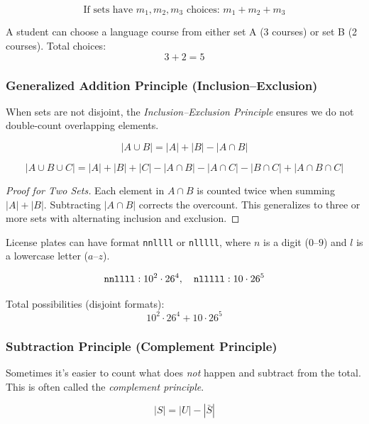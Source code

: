 \[
\text{If sets have } m_1, m_2, m_3 \text{ choices: } m_1 + m_2 + m_3
\]

\begin{eg}
A student can choose a language course from either set A (3 courses) or set B (2 courses). Total choices:
\[
3 + 2 = 5
\]
\end{eg}

\subsubsection{Generalized Addition Principle (Inclusion–Exclusion)} 
\begin{explanation}
When sets are not disjoint, the \emph{Inclusion–Exclusion Principle} ensures we do not double-count overlapping elements.
\end{explanation}

\[
|A \cup B| = |A| + |B| - |A \cap B|
\]

\[
|A \cup B \cup C| = |A| + |B| + |C| - |A \cap B| - |A \cap C| - |B \cap C| + |A \cap B \cap C|
\]

\begin{proof}[Proof for Two Sets]
Each element in $A \cap B$ is counted twice when summing $|A| + |B|$. Subtracting $|A \cap B|$ corrects the overcount. This generalizes to three or more sets with alternating inclusion and exclusion.
\end{proof}

\begin{eg}
License plates can have format \texttt{nnllll} or \texttt{nlllll}, where $n$ is a digit ($0$–$9$) and $l$ is a lowercase letter ($a$–$z$).

\[
\text{\texttt{nnllll}}: 10^2 \cdot 26^4, \quad 
\text{\texttt{nlllll}}: 10 \cdot 26^5
\]

Total possibilities (disjoint formats):
\[
10^2 \cdot 26^4 + 10 \cdot 26^5
\]
\end{eg}

\subsubsection{Subtraction Principle (Complement Principle)}
\begin{explanation}
Sometimes it's easier to count what does \emph{not} happen and subtract from the total. This is often called the \emph{complement principle}.
\end{explanation}

\[
|S| = |U| - |\bar{S}|
\]

